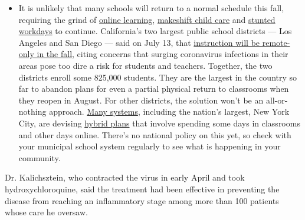 \begin{itemize}
  \begin{itemize}
  \tightlist
  \item
    It is unlikely that many schools will return to a normal schedule
    this fall, requiring the grind of
    \href{https://www.nytimes.com/2020/06/05/us/coronavirus-education-lost-learning.html?action=click\&pgtype=Article\&state=default\&region=MAIN_CONTENT_3\&context=storylines_faq}{online
    learning},
    \href{https://www.nytimes.com/2020/05/29/us/coronavirus-child-care-centers.html?action=click\&pgtype=Article\&state=default\&region=MAIN_CONTENT_3\&context=storylines_faq}{makeshift
    child care} and
    \href{https://www.nytimes.com/2020/06/03/business/economy/coronavirus-working-women.html?action=click\&pgtype=Article\&state=default\&region=MAIN_CONTENT_3\&context=storylines_faq}{stunted
    workdays} to continue. California's two largest public school
    districts --- Los Angeles and San Diego --- said on July 13, that
    \href{https://www.nytimes.com/2020/07/13/us/lausd-san-diego-school-reopening.html?action=click\&pgtype=Article\&state=default\&region=MAIN_CONTENT_3\&context=storylines_faq}{instruction
    will be remote-only in the fall}, citing concerns that surging
    coronavirus infections in their areas pose too dire a risk for
    students and teachers. Together, the two districts enroll some
    825,000 students. They are the largest in the country so far to
    abandon plans for even a partial physical return to classrooms when
    they reopen in August. For other districts, the solution won't be an
    all-or-nothing approach.
    \href{https://bioethics.jhu.edu/research-and-outreach/projects/eschool-initiative/school-policy-tracker/}{Many
    systems}, including the nation's largest, New York City, are
    devising
    \href{https://www.nytimes.com/2020/06/26/us/coronavirus-schools-reopen-fall.html?action=click\&pgtype=Article\&state=default\&region=MAIN_CONTENT_3\&context=storylines_faq}{hybrid
    plans} that involve spending some days in classrooms and other days
    online. There's no national policy on this yet, so check with your
    municipal school system regularly to see what is happening in your
    community.
  \end{itemize}
\end{itemize}

Dr. Kalichsztein, who contracted the virus in early April and took
hydroxychloroquine, said the treatment had been effective in preventing
the disease from reaching an inflammatory stage among more than 100
patients whose care he oversaw.

